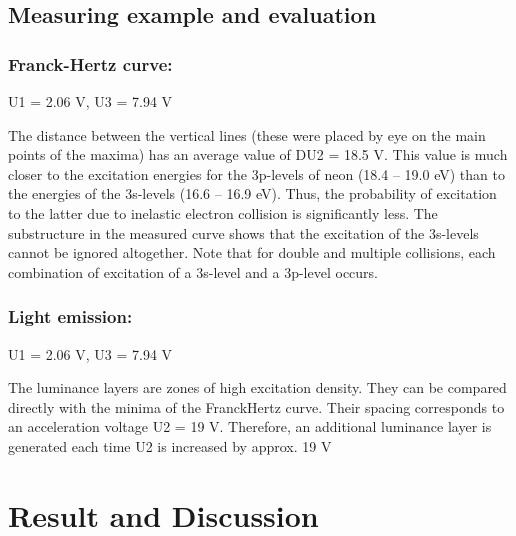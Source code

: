 \documentclass[a4paper, 10pt, nanum]{CSUniSchoolLabReport}
\begin{document}
\subsection{Measuring example and evaluation}

\subsubsection{Franck-Hertz curve:}
	U1 = 2.06 V, U3 = 7.94 V 

	The distance between the vertical lines (these were placed by eye on the main points of the maxima) has an average value of DU2 = 18.5 V. This value is much closer to the excitation energies for the 3p-levels of neon (18.4 – 19.0 eV) than to the energies of the 3s-levels (16.6 – 16.9 eV). Thus, the probability of excitation to the latter due to inelastic electron collision is significantly less. The substructure in the measured curve shows that the excitation of the 3s-levels cannot be ignored altogether. Note that for double and multiple collisions, each combination of excitation of a 3s-level and a 3p-level occurs. 

\subsubsection{Light emission:}
	U1 = 2.06 V, U3 = 7.94 V 

	The luminance layers are zones of high excitation density. They can be compared directly with the minima of the FranckHertz curve. Their spacing corresponds to an acceleration voltage U2 = 19 V. Therefore, an additional luminance layer is generated each time U2 is increased by approx. 19 V 




\section{Result and Discussion}
\end{document}
